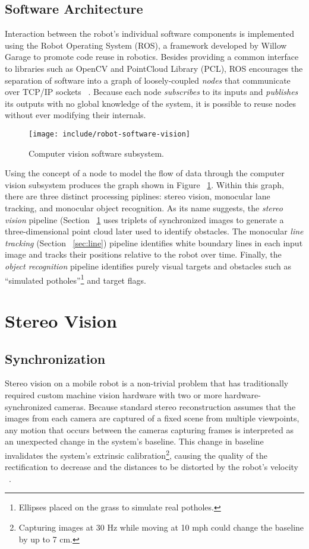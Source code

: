 \documentclass[11pt,twocolumn]{article}
\begin{document}
\subsection{Software Architecture}
\label{sec:robot-software}
Interaction between the robot's individual software components is implemented
using the Robot Operating System (ROS), a framework developed by Willow Garage
to promote code reuse in robotics. Besides providing a common interface to
libraries such as OpenCV and PointCloud Library (PCL), ROS encourages the
separation of software into a graph of loosely-coupled \textit{nodes} that
communicate over TCP/IP sockets ~\cite{ros}. Because each node
\textit{subscribes} to its inputs and \textit{publishes} its outputs with no
global knowledge of the system, it is possible to reuse nodes without ever
modifying their internals.

\begin{figure}
	\centering
	\texttt{[image: include/robot-software-vision]}
	\caption{Computer vision software subsystem.}
	\label{fig:robot-vision}
\end{figure}

Using the concept of a node to model the flow of data through the computer
vision subsystem produces the graph shown in Figure ~\ref{fig:robot-vision}.
Within this graph, there are three distinct processing piplines: stereo vision,
monocular lane tracking, and monocular object recognition. As its name
suggests, the \textit{stereo vision} pipeline (Section ~\ref{sec:stereo} uses
triplets of synchronized images to generate a three-dimensional point cloud
later used to identify obstacles. The monocular \textit{line tracking} (Section
~\ref{sec:line}) pipeline identifies white boundary lines in each input image
and tracks their positions relative to the robot over time. Finally, the
\textit{object recognition} pipeline identifies purely visual targets and
obstacles such as ``simulated potholes''\footnote{Ellipses placed on the grass
to simulate real potholes.} and target flags.

\section{Stereo Vision}
\label{sec:stereo}
%
%
%
%
%
%

\subsection{Synchronization}
\label{sec:stereo-sync}
Stereo vision on a mobile robot is a non-trivial problem that has traditionally
required custom machine vision hardware with two or more hardware-synchronized
cameras. Because standard stereo reconstruction assumes that the images from
each camera are captured of a fixed scene from multiple viewpoints, any motion
that occurs between the cameras capturing frames is interpreted as an
unexpected change in the system's baseline. This change in baseline invalidates
the system's extrinsic calibration\footnote{Capturing images at 30 Hz while
moving at 10 mph could change the baseline by up to 7 cm.}, causing the quality
of the rectification to decrease and the distances to be distorted by the
robot's velocity ~\cite{unsync}.
\end{document}
